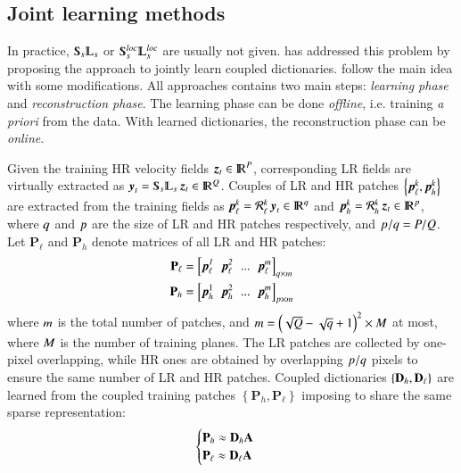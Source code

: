\subsection{Joint learning methods}
\label{sec:joint_learning_methods}
In practice, $ \Sub_s\LPF_s $ or $ \Sub_s^{loc}\LPF_s^{loc} $ are usually not given. \citet{yang2010image} has addressed this problem by proposing the approach to jointly learn coupled dictionaries. \citet{zeyde2012single} follow the main idea with some modifications. All approaches contains two main steps: \textit{learning phase} and \textit{reconstruction phase}. The learning phase can be done \textit{offline}, i.e. training \textit{a priori} from the data. With learned dictionaries, the reconstruction phase can be \textit{online}.

Given the training HR velocity fields $ \operatorname{\boldsymbol{z}}_t \in {\rm I\!R}^{P} $, corresponding LR fields are virtually extracted as $ \y_t=\Sub_s\LPF_s\z_t \in \R^{\dimsl}$. Couples of LR and HR patches $ \left\lbrace  \operatorname{\mathit{\operatorname{\boldsymbol{p}}_{\ell}^{k}}},\operatorname{\mathit{\operatorname{\boldsymbol{p}}_h^{k}}}  \right\rbrace $ are extracted from the training fields as $ \operatorname{\mathit{\operatorname{\boldsymbol{p}}_{\ell}^{k}}}= \operatorname{\mathcal{R}_{\ell}^{\mathit{k}}} \operatorname{\boldsymbol{y}}_t\in  {\rm I\!R}^q $ and $ \operatorname{\mathit{\operatorname{\boldsymbol{p}}_h^{k}}}= \operatorname{\mathit{\mathcal{R}_h^{k}}} \operatorname{\boldsymbol{z}}_t\in  {\rm I\!R}^p $, where $ q $ and $ p $ are the size of LR and HR patches respectively, and $ p/q = P / Q $. Let $ \mathbf{P}_\ell $ and $ \mathbf{P}_h $ denote matrices of all LR and HR patches:
\begin{equation}
	\begin{split}
		\mathbf{P}_\ell&=\left[\operatorname{\mathit{\operatorname{\boldsymbol{p}}_{\ell}^{1}}} \:\: \operatorname{\mathit{\operatorname{\boldsymbol{p}}_{\ell}^{2}}} \:\: ... \:\: \operatorname{\mathit{\operatorname{\boldsymbol{p}}_{\ell}^{m}}}\right]_{q \times m} \\
		\mathbf{P}_h&=\left[\operatorname{\boldsymbol{p}}_h^1 \:\: \operatorname{\boldsymbol{p}}_h^2 \:\: ... \:\: \operatorname{\boldsymbol{p}}_h^{m}\right]_{p \times m}
	\end{split}
	\label{eq:jointlearning1}
\end{equation}
where $ m $ is the total number of patches, and $ m = \left(\sqrt{Q} - \sqrt{q} + 1\right)^2 \times M$ at most, where $ M $ is the number of training planes. The LR patches are collected by one-pixel overlapping, while HR ones are obtained by overlapping $ p/q $ pixels to ensure the same number of LR and HR patches. Coupled dictionaries $ \left\lbrace \mathbf{D}_h ,\mathbf{D}_\ell  \right\rbrace $ are learned from the coupled training patches $ \left\lbrace \mathbf{P}_h ,\mathbf{P}_\ell  \right\rbrace $ imposing to share the same sparse representation:
\begin{equation}
\begin{cases}
	\mathbf{P}_h \approx \mathbf{D}_h \mathbf{A}\\
	\mathbf{P}_\ell \approx \mathbf{D}_\ell \mathbf{A}\\
\end{cases}
\end{equation}            
